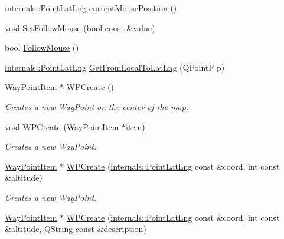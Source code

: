 \begin{DoxyCompactItemize}
\item 
\hyperlink{structinternals_1_1_point_lat_lng}{internals\-::\-Point\-Lat\-Lng} \hyperlink{group___o_p_map_widget_gabb9370f367fc42a3987983e79db0828a}{current\-Mouse\-Position} ()
\item 
\hyperlink{group___u_a_v_objects_plugin_ga444cf2ff3f0ecbe028adce838d373f5c}{void} \hyperlink{group___o_p_map_widget_ga9713d4bd6a80debb60fbb66d3e55ebd3}{\-Set\-Follow\-Mouse} (bool const \&value)
\item 
bool \hyperlink{group___o_p_map_widget_gab4d31649441240def7d389c4d814c6a2}{\-Follow\-Mouse} ()
\item 
\hyperlink{structinternals_1_1_point_lat_lng}{internals\-::\-Point\-Lat\-Lng} \hyperlink{group___o_p_map_widget_ga350ef32ca621e11b3d5a2d3fe4aeaca6}{\-Get\-From\-Local\-To\-Lat\-Lng} (\-Q\-Point\-F p)
\item 
\hyperlink{classmapcontrol_1_1_way_point_item}{\-Way\-Point\-Item} $\ast$ \hyperlink{group___o_p_map_widget_ga7a23e7347fa5504a5af7d58e66161fa2}{\-W\-P\-Create} ()
\begin{DoxyCompactList}\small\item\em \-Creates a new \-Way\-Point on the center of the map. \end{DoxyCompactList}\item 
\hyperlink{group___u_a_v_objects_plugin_ga444cf2ff3f0ecbe028adce838d373f5c}{void} \hyperlink{group___o_p_map_widget_gaf4409d0e8417e7cce528af31cef4dfe4}{\-W\-P\-Create} (\hyperlink{classmapcontrol_1_1_way_point_item}{\-Way\-Point\-Item} $\ast$item)
\begin{DoxyCompactList}\small\item\em \-Creates a new \-Way\-Point. \end{DoxyCompactList}\item 
\hyperlink{classmapcontrol_1_1_way_point_item}{\-Way\-Point\-Item} $\ast$ \hyperlink{group___o_p_map_widget_gac17ec2fbbcf0065570ad8d8568729521}{\-W\-P\-Create} (\hyperlink{structinternals_1_1_point_lat_lng}{internals\-::\-Point\-Lat\-Lng} const \&coord, int const \&altitude)
\begin{DoxyCompactList}\small\item\em \-Creates a new \-Way\-Point. \end{DoxyCompactList}\item 
\hyperlink{classmapcontrol_1_1_way_point_item}{\-Way\-Point\-Item} $\ast$ \hyperlink{group___o_p_map_widget_gae95af6f438774b8cddf4b8b4d670483c}{\-W\-P\-Create} (\hyperlink{structinternals_1_1_point_lat_lng}{internals\-::\-Point\-Lat\-Lng} const \&coord, int const \&altitude, \hyperlink{group___u_a_v_objects_plugin_gab9d252f49c333c94a72f97ce3105a32d}{\-Q\-String} const \&description)

\end{DoxyCompactItemize}
